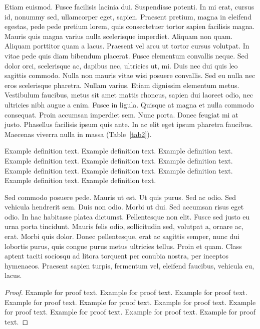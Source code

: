 \documentclass[AMA,Times1COL]{WileyNJDv5} %
\begin{document}
Etiam euismod. Fusce facilisis lacinia dui. Suspendisse potenti. In mi erat, cursus id, nonummy sed, ullamcorper
eget, sapien. Praesent pretium, magna in eleifend egestas, pede pede pretium lorem, quis consectetuer tortor sapien
facilisis magna. Mauris quis magna varius nulla scelerisque imperdiet. Aliquam non quam. Aliquam porttitor quam
a lacus. Praesent vel arcu ut tortor cursus volutpat. In vitae pede quis diam bibendum placerat. Fusce elementum
convallis neque. Sed dolor orci, scelerisque ac, dapibus nec, ultricies ut, mi. Duis nec dui quis leo sagittis commodo.
Nulla non mauris vitae wisi posuere convallis. Sed eu nulla nec eros scelerisque pharetra. Nullam varius. Etiam
dignissim elementum metus. Vestibulum faucibus, metus sit amet mattis rhoncus, sapien dui laoreet odio, nec ultricies
nibh augue a enim. Fusce in ligula. Quisque at magna et nulla commodo consequat. Proin accumsan imperdiet sem.
Nunc porta. Donec feugiat mi at justo. Phasellus facilisis ipsum quis ante. In ac elit eget ipsum pharetra faucibus.
Maecenas viverra nulla in massa (Table~\ref{tab2}).

\begin{definition}
Example definition text. Example definition text. Example definition text. Example definition text. Example definition text. Example definition text. Example definition text. Example definition text. Example definition text. Example definition text. Example definition text.
\end{definition}

Sed commodo posuere pede. Mauris ut est. Ut quis purus. Sed ac odio. Sed vehicula hendrerit sem. Duis non
odio. Morbi ut dui. Sed accumsan risus eget odio. In hac habitasse platea dictumst. Pellentesque non elit. Fusce
sed justo eu urna porta tincidunt. Mauris felis odio, sollicitudin sed, volutpat a, ornare ac, erat. Morbi quis dolor.
Donec pellentesque, erat ac sagittis semper, nunc dui lobortis purus, quis congue purus metus ultricies tellus. Proin
et quam. Class aptent taciti sociosqu ad litora torquent per conubia nostra, per inceptos hymenaeos. Praesent sapien
turpis, fermentum vel, eleifend faucibus, vehicula eu, lacus.


\begin{proof}
Example for proof text. Example for proof text. Example for proof text. Example for proof text. Example for proof text. Example for proof text. Example for proof text. Example for proof text. Example for proof text. Example for proof text.
\end{proof}
\end{document}
